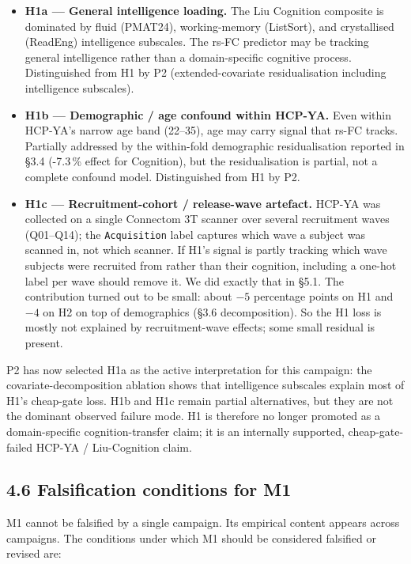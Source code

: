 \documentclass[11pt,letterpaper]{report}
\begin{document}
\begin{itemize}[leftmargin=1.6em,itemsep=0.2em]
\item \textbf{H1a --- General intelligence loading.} The Liu Cognition composite is dominated by fluid (PMAT24), working-memory (ListSort), and crystallised (ReadEng) intelligence subscales. The rs-FC predictor may be tracking general intelligence rather than a domain-specific cognitive process. Distinguished from H1 by P2 (extended-covariate residualisation including intelligence subscales).
\item \textbf{H1b --- Demographic / age confound within HCP-YA.} Even within HCP-YA's narrow age band (22--35), age may carry signal that rs-FC tracks. Partially addressed by the within-fold demographic residualisation reported in \S3.4 (-7.3\,\% effect for Cognition), but the residualisation is partial, not a complete confound model. Distinguished from H1 by P2.
\item \textbf{H1c --- Recruitment-cohort / release-wave artefact.} HCP-YA was collected on a single Connectom 3T scanner over several recruitment waves (Q01--Q14); the \texttt{Acquisition} label captures which wave a subject was scanned in, not which scanner. If H1's signal is partly tracking which wave subjects were recruited from rather than their cognition, including a one-hot label per wave should remove it. We did exactly that in \S5.1. The contribution turned out to be small: about $-5$ percentage points on H1 and $-4$ on H2 on top of demographics (\S3.6 decomposition). So the H1 loss is mostly not explained by recruitment-wave effects; some small residual is present.
\end{itemize}

P2 has now selected H1a as the active interpretation for this campaign: the covariate-decomposition ablation shows that intelligence subscales explain most of H1's cheap-gate loss. H1b and H1c remain partial alternatives, but they are not the dominant observed failure mode. H1 is therefore no longer promoted as a domain-specific cognition-transfer claim; it is an internally supported, cheap-gate-failed HCP-YA / Liu-Cognition claim.

\subsection*{4.6 Falsification conditions for M1}

M1 cannot be falsified by a single campaign. Its empirical content appears across campaigns. The conditions under which M1 should be considered falsified or revised are:
\end{document}

